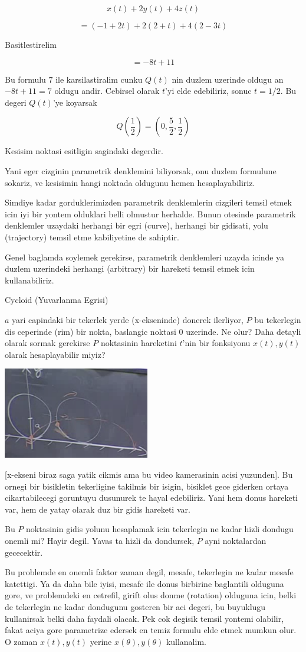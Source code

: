 \documentclass[12pt,fleqn]{article}
\begin{document}
\[ x(t) + 2y(t) + 4z(t) \]

\[ = (-1+2t) + 2(2+t) + 4(2-3t) \]

Basitlestirelim

\[ = -8t + 11 \]

Bu formulu $7$ ile karsilastiralim cunku $Q(t)$ nin duzlem uzerinde oldugu
an $-8t + 11 = 7$ oldugu andir. Cebirsel olarak $t$'yi elde edebiliriz,
sonuc $t=1/2$. Bu degeri $Q(t)$'ye koyarsak

\[ Q(\frac{1}{2}) = (0,\frac{5}{2},\frac{1}{2}) \]

Kesisim noktasi esitligin sagindaki degerdir.

Yani eger cizginin parametrik denklemini biliyorsak, onu duzlem formulune
sokariz, ve kesisimin hangi noktada oldugunu hemen hesaplayabiliriz. 

Simdiye kadar gorduklerimizden parametrik denklemlerin cizgileri temsil
etmek icin iyi bir yontem olduklari belli olmustur herhalde. Bunun otesinde
parametrik denklemler uzaydaki herhangi bir egri (curve), herhangi bir
gidisati, yolu (trajectory) temsil etme kabiliyetine de sahiptir. 

Genel baglamda soylemek gerekirse, parametrik denklemleri uzayda icinde ya
duzlem uzerindeki herhangi (arbitrary) bir hareketi temsil etmek icin
kullanabiliriz.

Cycloid (Yuvarlanma Egrisi)

$a$ yari capindaki bir tekerlek yerde (x-ekseninde) donerek ilerliyor, $P$ bu
tekerlegin dis ceperinde (rim) bir nokta, baslangic noktasi 0 uzerinde. Ne
olur? Daha detayli olarak sormak gerekirse $P$ noktasinin hareketini
$t$'nin bir fonksiyonu $x(t),y(t)$ olarak hesaplayabilir miyiz?

\includegraphics[height=4cm]{5_3.png}

[x-ekseni biraz saga yatik cikmis ama bu video kamerasinin acisi
yuzunden]. Bu ornegi bir bisikletin tekerligine takilmis bir isigin,
bisiklet gece giderken ortaya cikartabilecegi goruntuyu dusunurek te hayal
edebiliriz. Yani hem donus hareketi var, hem de yatay olarak duz bir gidis
hareketi var.

Bu $P$ noktasinin gidis yolunu hesaplamak icin tekerlegin ne kadar hizli
dondugu onemli mi? Hayir degil. Yavas ta hizli da dondursek, $P$ ayni
noktalardan gececektir. 

Bu problemde en onemli faktor zaman degil, mesafe, tekerlegin ne kadar
mesafe katettigi. Ya da daha bile iyisi, mesafe ile donus birbirine
baglantili olduguna gore, ve problemdeki en cetrefil, girift olus donme
(rotation) olduguna icin, belki de tekerlegin ne kadar dondugunu gosteren
bir aci degeri, bu buyuklugu kullanirsak belki daha faydali olacak. Pek cok
degisik temsil yontemi olabilir, fakat aciya gore parametrize edersek en
temiz formulu elde etmek mumkun olur. O zaman $x(t),y(t)$ yerine
$x(\theta),y(\theta)$ kullanalim. 
\end{document}
